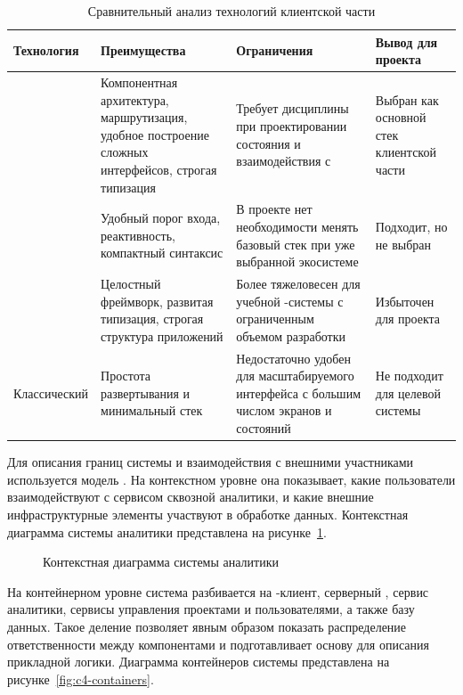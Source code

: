\begin{table}[H]
    \caption{Сравнительный анализ технологий клиентской части}
    \label{tab:frontend-technologies}
    {\small
    \setlength{\tabcolsep}{4pt}
    \begin{tabularx}{\textwidth}{|P{0.22\textwidth}|L|L|L|}
        \hline
        Технология & Преимущества & Ограничения & Вывод для проекта \\
        \hline
         & Компонентная архитектура, маршрутизация, удобное построение сложных интерфейсов, строгая типизация & Требует дисциплины при проектировании состояния и взаимодействия с  & Выбран как основной стек клиентской части \\
        \hline
         & Удобный порог входа, реактивность, компактный синтаксис & В проекте нет необходимости менять базовый стек при уже выбранной экосистеме  & Подходит, но не выбран \\
        \hline
         & Целостный фреймворк, развитая типизация, строгая структура приложений & Более тяжеловесен для учебной -системы с ограниченным объемом разработки & Избыточен для проекта \\
        \hline
        Классический  & Простота развертывания и минимальный стек & Недостаточно удобен для масштабируемого интерфейса с большим числом экранов и состояний & Не подходит для целевой системы \\
        \hline
    \end{tabularx}
    }
\end{table}

Для описания границ системы и взаимодействия с внешними участниками используется модель . На контекстном уровне она показывает, какие пользователи взаимодействуют с сервисом сквозной аналитики, и какие внешние инфраструктурные элементы участвуют в обработке данных. Контекстная диаграмма  системы аналитики представлена на рисунке~\ref{fig:c4-context}.

\begin{figure}[H]
    \centering
    \caption{Контекстная диаграмма  системы аналитики}
    \label{fig:c4-context}
\end{figure}

На контейнерном уровне система разбивается на -клиент, серверный , сервис аналитики, сервисы управления проектами и пользователями, а также базу данных. Такое деление позволяет явным образом показать распределение ответственности между компонентами и подготавливает основу для описания прикладной логики. Диаграмма контейнеров системы представлена на рисунке~\ref{fig:c4-containers}.

